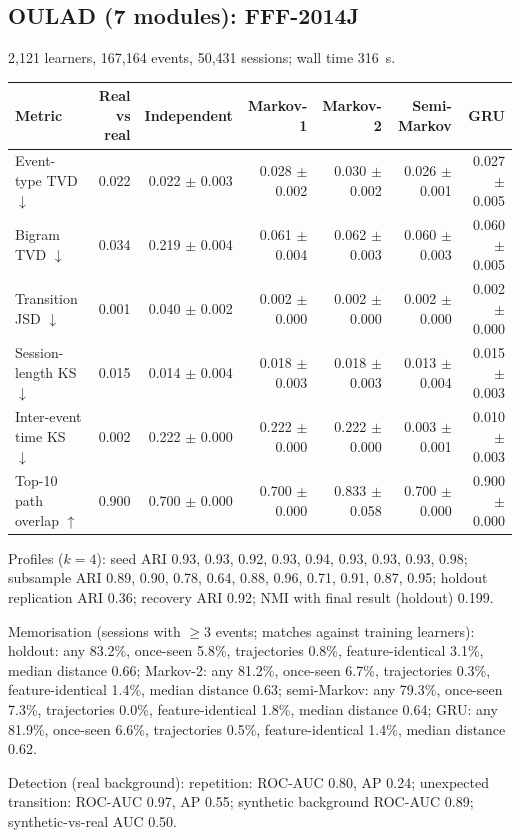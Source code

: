 \subsection*{OULAD (7 modules): FFF-2014J}
2{,}121 learners, 167{,}164 events, 50{,}431 sessions; wall time 316~s.

\begin{tabular}{l r r r r r r }
\toprule
Metric & Real vs real & Independent & Markov-1 & Markov-2 & Semi-Markov & GRU \\
\midrule
Event-type TVD $\downarrow$ & 0.022 & 0.022 $\pm$ 0.003 & 0.028 $\pm$ 0.002 & 0.030 $\pm$ 0.002 & 0.026 $\pm$ 0.001 & 0.027 $\pm$ 0.005 \\
Bigram TVD $\downarrow$ & 0.034 & 0.219 $\pm$ 0.004 & 0.061 $\pm$ 0.004 & 0.062 $\pm$ 0.003 & 0.060 $\pm$ 0.003 & 0.060 $\pm$ 0.005 \\
Transition JSD $\downarrow$ & 0.001 & 0.040 $\pm$ 0.002 & 0.002 $\pm$ 0.000 & 0.002 $\pm$ 0.000 & 0.002 $\pm$ 0.000 & 0.002 $\pm$ 0.000 \\
Session-length KS $\downarrow$ & 0.015 & 0.014 $\pm$ 0.004 & 0.018 $\pm$ 0.003 & 0.018 $\pm$ 0.003 & 0.013 $\pm$ 0.004 & 0.015 $\pm$ 0.003 \\
Inter-event time KS $\downarrow$ & 0.002 & 0.222 $\pm$ 0.000 & 0.222 $\pm$ 0.000 & 0.222 $\pm$ 0.000 & 0.003 $\pm$ 0.001 & 0.010 $\pm$ 0.003 \\
Top-10 path overlap $\uparrow$ & 0.900 & 0.700 $\pm$ 0.000 & 0.700 $\pm$ 0.000 & 0.833 $\pm$ 0.058 & 0.700 $\pm$ 0.000 & 0.900 $\pm$ 0.000 \\
\bottomrule
\end{tabular}

Profiles ($k=4$): seed ARI 0.93, 0.93, 0.92, 0.93, 0.94, 0.93, 0.93, 0.93, 0.98; subsample ARI 0.89, 0.90, 0.78, 0.64, 0.88, 0.96, 0.71, 0.91, 0.87, 0.95; holdout replication ARI 0.36; recovery ARI 0.92; NMI with final result (holdout) 0.199.

Memorisation (sessions with $\geq$3 events; matches against training learners): holdout: any 83.2\%, once-seen 5.8\%, trajectories 0.8\%, feature-identical 3.1\%, median distance 0.66; Markov-2: any 81.2\%, once-seen 6.7\%, trajectories 0.3\%, feature-identical 1.4\%, median distance 0.63; semi-Markov: any 79.3\%, once-seen 7.3\%, trajectories 0.0\%, feature-identical 1.8\%, median distance 0.64; GRU: any 81.9\%, once-seen 6.6\%, trajectories 0.5\%, feature-identical 1.4\%, median distance 0.62.

Detection (real background): repetition: ROC-AUC 0.80, AP 0.24; unexpected transition: ROC-AUC 0.97, AP 0.55; synthetic background ROC-AUC 0.89; synthetic-vs-real AUC 0.50.

